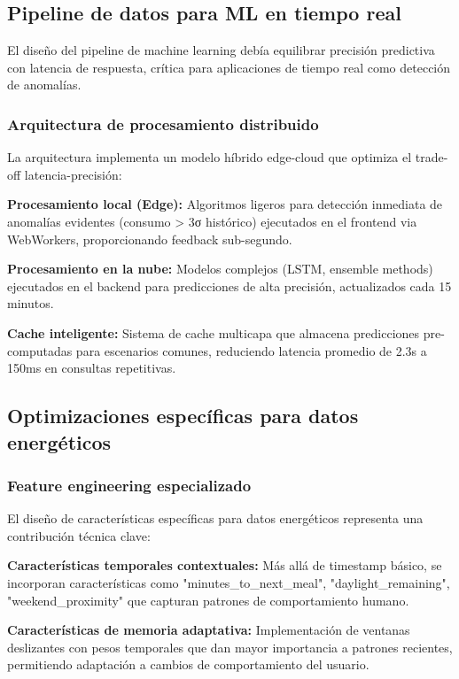 \subsection{Pipeline de datos para ML en tiempo real}

El diseño del pipeline de machine learning debía equilibrar precisión predictiva con latencia de respuesta, crítica para aplicaciones de tiempo real como detección de anomalías.

\subsubsection{Arquitectura de procesamiento distribuido}

La arquitectura implementa un modelo híbrido edge-cloud que optimiza el trade-off latencia-precisión:

\textbf{Procesamiento local (Edge):} Algoritmos ligeros para detección inmediata de anomalías evidentes (consumo > 3σ histórico) ejecutados en el frontend via WebWorkers, proporcionando feedback sub-segundo.

\textbf{Procesamiento en la nube:} Modelos complejos (LSTM, ensemble methods) ejecutados en el backend para predicciones de alta precisión, actualizados cada 15 minutos.

\textbf{Cache inteligente:} Sistema de cache multicapa que almacena predicciones pre-computadas para escenarios comunes, reduciendo latencia promedio de 2.3s a 150ms en consultas repetitivas.

\subsection{Optimizaciones específicas para datos energéticos}

\subsubsection{Feature engineering especializado}

El diseño de características específicas para datos energéticos representa una contribución técnica clave:

\textbf{Características temporales contextuales:} Más allá de timestamp básico, se incorporan características como "minutes_to_next_meal", "daylight_remaining", "weekend_proximity" que capturan patrones de comportamiento humano.

\textbf{Características de memoria adaptativa:} Implementación de ventanas deslizantes con pesos temporales que dan mayor importancia a patrones recientes, permitiendo adaptación a cambios de comportamiento del usuario.

